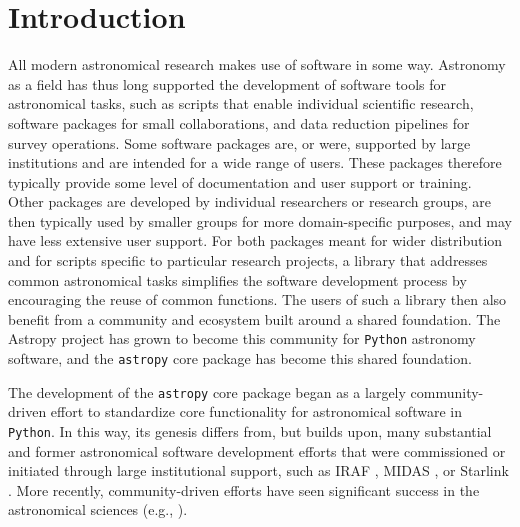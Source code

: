 \documentclass[modern]{aastex62}
\newcommand{\package}[1]{\texttt{#1}\xspace}
\newcommand{\python}{\package{Python}}
\newcommand{\astropy}{Astropy\xspace}
\newcommand{\astropypkg}{\package{astropy}}
\begin{document}
\section{Introduction} \label{sec:intro}
All modern astronomical research makes use of software in some way.
Astronomy as a field has thus long supported the development of software tools
for astronomical tasks, such as scripts that enable individual scientific
research, software packages for small collaborations, and data reduction
pipelines for survey operations.
Some software packages are, or were, supported by large institutions and are
intended for a wide range of users.
These packages therefore typically provide some level of documentation and user
support or training.
Other packages are developed by individual researchers or research groups,
are then typically used by smaller groups for more domain-specific purposes, and 
may have less extensive user support. 
For both packages meant for wider distribution and for scripts specific to
particular research projects, a library that addresses common astronomical tasks
simplifies the software development process by encouraging the reuse of common
functions.  
The users of such a library then also benefit from a community and ecosystem
built around a shared foundation.
The \astropy project has grown to become this community for \python astronomy
software, and the \astropypkg core package has become this shared foundation.

The development of the \astropypkg core package began as a largely
community-driven effort to standardize core functionality for astronomical
software in \python.
In this way, its genesis differs from, but builds upon, many substantial and
former astronomical software development efforts that were commissioned or
initiated through large institutional support, such as IRAF \citep[developed
at NOAO;][]{IRAF}, MIDAS \citep[developed at ESO;][]{MIDAS}, or Starlink
\citep[originally developed by a consortium of UK institutions and now
maintained by the East Asian Observatory;][]{starlink1982,starlink2013}.
More recently, community-driven efforts have seen significant success in the astronomical sciences (e.g., \citealt{yt}).
\end{document}
